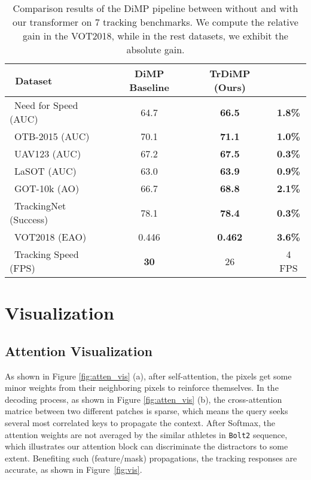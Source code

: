 \documentclass[10pt,twocolumn,letterpaper]{article}
\begin{document}
\setlength{\tabcolsep}{2pt}
\begin{table}[t]
	\scriptsize
	\begin{center}
		\caption{Comparison results of the DiMP pipeline between without and with our transformer on 7 tracking benchmarks. We compute the relative gain in the VOT2018, while in the rest datasets, we exhibit the absolute gain.} \label{table:dimp_ablation}	
		\vspace{+0.05in} 
		\begin{tabular*}{8.2 cm} {@{\extracolsep{\fill}}lccc}
			\hline
			~Dataset &DiMP Baseline &{\bf TrDiMP (Ours)} &\\
			\hline
			~Need for Speed \cite{NFSdataset} (AUC) &64.7 &\bf 66.5  &\bf 1.8\%\\
			~OTB-2015 \cite{OTB-2015} (AUC)  &70.1 &\bf 71.1 &\bf 1.0\%\\
			~UAV123 \cite{UAV123} (AUC)  &67.2 &\bf 67.5  &\bf 0.3\%\\
			~LaSOT \cite{LaSOT} (AUC)  &63.0 &\bf 63.9 &\bf 0.9\%\\
			~GOT-10k \cite{GOT10k} (AO) &66.7 &\bf 68.8  &\bf 2.1\%\\
			~TrackingNet \cite{2018trackingnet} (Success) &78.1 &\bf 78.4  &\bf 0.3\%\\
			~VOT2018 \cite{VOT2018} (EAO)  &0.446 &\bf 0.462 &\bf 3.6\%\\
			\hline
			~Tracking Speed (FPS) &\bf 30 &26  &4 FPS \\
			\hline
		\end{tabular*}
	\end{center}
	\vspace{-0.1in}
\end{table} 



\section{Visualization}

\subsection{Attention Visualization}

As shown in Figure \ref{fig:atten_vis} (a), after self-attention, the pixels get some minor weights from their neighboring pixels to reinforce themselves. 
In the decoding process, as shown in Figure \ref{fig:atten_vis} (b), the cross-attention matrice between two different patches is sparse, which means the query seeks several most correlated keys to propagate the context.
After Softmax, the attention weights are not averaged by the similar athletes in {\tt Bolt2} sequence, which illustrates our attention block can discriminate the distractors to some extent. Benefiting such (feature/mask) propagations, the tracking responses are accurate, as shown in Figure~\ref{fig:vis}.
\end{document}
